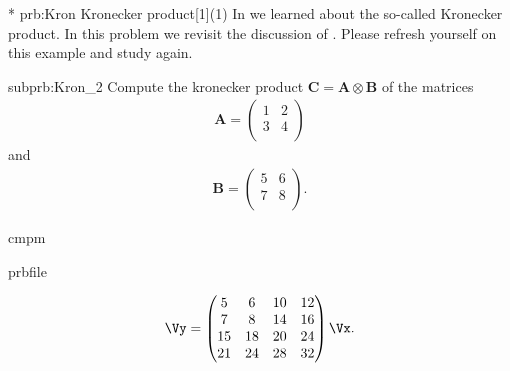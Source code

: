 \renewcommand{\ProblemName}{Kronecker}

\begin{samproblem}*
  {prb:Kron}
  {Kronecker product}[1](1)
  {
    In  we learned about the so-called Kronecker product.
    In this problem we revisit the
    discussion of . Please refresh yourself on this example and
    study  again.
  }

\begin{subproblem}{subprb:Kron_2}
  Compute the kronecker product
  $\mathbf{C} = \mathbf{A} \otimes \mathbf{B}$ of the matrices
\begin{align*}
  \mathbf{A} = \begin{pmatrix}
         1 & 2   \\
         3 & 4   \\
       \end{pmatrix}
\end{align*}
and
\begin{align*}
\mathbf{B}=\begin{pmatrix}
         5 & 6   \\
         7 & 8   \\
       \end{pmatrix}.
\end{align*}

\begin{samwriteprbpart}{cmpm}
  \begin{writeverbatim}{prbfile}
    \begin{samsolution}
      \begin{align*}
\Vy=\begin{pmatrix}
         5 & 6 & 10 & 12  \\
         7 & 8 & 14 & 16  \\
         15 & 18 & 20 & 24  \\
         21 & 24 & 28 & 32  \\
       \end{pmatrix}\Vx.
        \end{align*}
      \end{samsolution}
    \end{writeverbatim}
  \end{samwriteprbpart}
\end{subproblem}


\end{samproblem}
